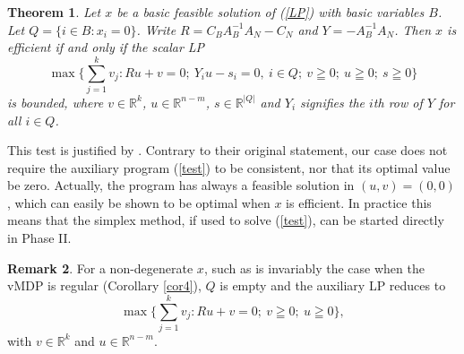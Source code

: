 \documentclass{article}
\newtheorem{theorem}{Theorem}[section]
\theoremstyle{definition}
\newtheorem{remark}[theorem]{Remark}
\numberwithin{equation}{section}
\begin{document}

\begin{theorem}
\label{thm_cor22}
Let $x$ be a basic feasible solution of {\rm (\ref{LP})} with basic variables $B$. Let $Q = \{i \in B: x_{i} = 0\}$. Write $R = C_{B}A_B^{-1}A_N - C_N$ and $Y = -A_B^{-1}A_N$. Then $x$ is efficient if and only if the scalar LP 
\begin{equation}
\label{test}
\max\biggl\{\sum_{j = 1}^{k}v_j: Ru + v = 0;\ Y_iu - s_i = 0,\ i \in Q;\ v \geqq 0;\ u \geqq 0;\ s \geqq 0\biggr\}
\end{equation} is bounded, where $v \in \mathbb{R}^k$, $u \in \mathbb{R}^{n-m}$, $s \in \mathbb{R}^{|Q|}$ and $Y_i$ signifies the $i$th row of $Y$ for all $i \in Q$.
\end{theorem}

This test is justified by \cite[Lemma 2.4]{7}.  %
Contrary to their original statement, our case does not require the auxiliary program (\ref{test}) to be consistent, nor that its optimal value be zero. Actually, the program has always a feasible solution in $(u, v) = (0, 0)$, which can easily be shown to be optimal when $x$ is efficient. In practice this means that the simplex method, if used to solve (\ref{test}), can be started directly in Phase II.

\begin{remark}For a non-degenerate $x$, such as is invariably the case when the vMDP is regular (Corollary {\rm \ref{cor4}}), $Q$ is empty and the auxiliary LP reduces to 
\begin{equation*}
\label{test_regular}
\max\biggl\{\sum_{j = 1}^{k}v_j: Ru + v = 0;\ v \geqq 0;\ u \geqq 0 \biggr\},
\end{equation*}
with $v \in \mathbb{R}^k$ and $u \in \mathbb{R}^{n-m}$.
\end{remark}
\end{document}
